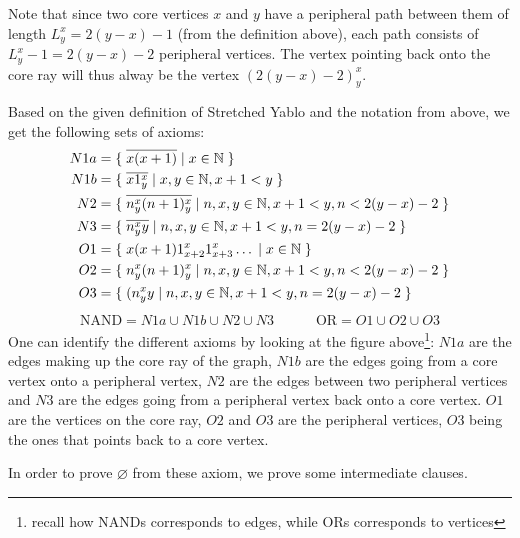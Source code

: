 Note that since two core vertices $x$ and $y$ have a peripheral path between them of length $L^x_y = 2(y-x) - 1$ (from the definition above), each path consists of $L^x_y - 1 = 2(y-x) - 2$ peripheral vertices.
The vertex pointing back onto the core ray will thus alway be the vertex $(2(y-x)-2)^x_y$.

Based on the given definition of Stretched Yablo and the notation from above, we get the following sets of axioms:
\begin{align}
  N1a &= \{\; \overline{x(x+1)} \;|\; x \in \mathbb{N} \; \} \\
	N1b &= \{\; \overline{x1^x_y} \;|\; x,y \in \mathbb{N}, x+1 < y \; \} \\
	N2 &= \{\; \overline{n^x_y(n+1)^x_y} \;|\; n,x,y \in \mathbb{N}, x+1 < y, n < 2(y-x) - 2 \; \} \\
	N3 &= \{\; \overline{n^x_yy} \;|\; n,x,y \in \mathbb{N}, x+1 < y, n = 2(y-x)-2 \; \} \\
	O1 &= \{\; x(x+1)1^x_{x+2}1^x_{x+3}\dots \;|\; x \in \mathbb{N} \; \} \\
  O2 &= \{\; n^x_y(n+1)^x_y \;|\; n,x,y \in \mathbb{N}, x+1 < y, n < 2(y-x) - 2 \; \} \\
	O3 &= \{\; (n^x_yy \;|\; n,x,y \in \mathbb{N}, x+1 < y, n = 2(y-x)-2 \; \}
\end{align}
\begin{align}
  \text{NAND} = N1a \cup N1b \cup N2 \cup N3 \quad\quad\quad \text{OR} = O1 \cup O2 \cup O3
\end{align}
One can identify the different axioms by looking at the figure above\footnote{recall how NANDs corresponds to edges, while ORs corresponds to vertices}:
$N1a$ are the edges making up the core ray of the graph, $N1b$ are the edges going from a core vertex onto a peripheral vertex, $N2$ are the edges between two peripheral vertices and $N3$ are the edges going from a peripheral vertex back onto a core vertex.
$O1$ are the vertices on the core ray, $O2$ and $O3$ are the peripheral vertices, $O3$ being the ones that points back to a core vertex.

In order to prove $\varnothing$ from these axiom, we prove some intermediate clauses.
